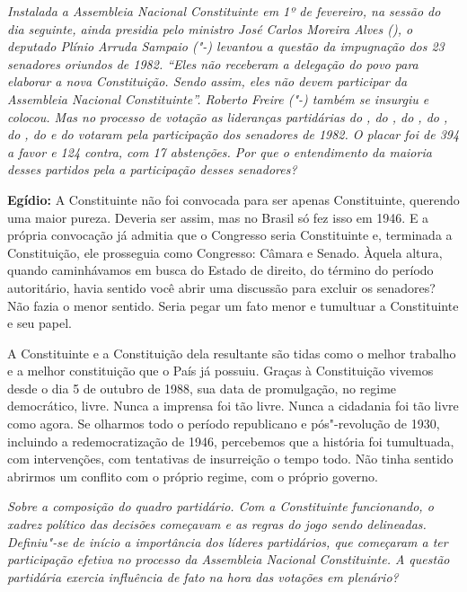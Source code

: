 \emph{Instalada a Assembleia Nacional Constituinte em 1º de fevereiro,
na sessão do dia seguinte, ainda presidia pelo ministro José Carlos
Moreira Alves (), o deputado Plínio Arruda Sampaio ("-) levantou a
questão da impugnação dos 23 senadores oriundos de 1982. ``Eles não
receberam a delegação do povo para elaborar a nova Constituição. Sendo
assim, eles não devem participar da Assembleia Nacional Constituinte''.
Roberto Freire ("-) também se insurgiu e colocou. Mas no processo de
votação as lideranças partidárias do , do , do , do , do
, do  e do  votaram pela participação dos senadores de 1982. O
placar foi de 394 a favor e 124 contra, com 17 abstenções. Por que o
entendimento da maioria desses partidos pela a participação desses
senadores?}

\textbf{Egídio:} A Constituinte não foi convocada para ser apenas
Constituinte, querendo uma maior pureza. Deveria ser assim, mas no
Brasil só fez isso em 1946. E a própria convocação já admitia que o
Congresso seria Constituinte e, terminada a Constituição, ele prosseguia
como Congresso: Câmara e Senado. Àquela altura, quando caminhávamos em
busca do Estado de direito, do término do período autoritário, havia
sentido você abrir uma discussão para excluir os senadores? Não fazia o
menor sentido. Seria pegar um fato menor e tumultuar a Constituinte e
seu papel.

A Constituinte e a Constituição dela resultante são tidas como o melhor
trabalho e a melhor constituição que o País já possuiu. Graças à
Constituição vivemos desde o dia 5 de outubro de 1988, sua data de
promulgação, no regime democrático, livre. Nunca a imprensa foi tão
livre. Nunca a cidadania foi tão livre como agora. Se olharmos todo o
período republicano e pós"-revolução de 1930, incluindo a
redemocratização de 1946, percebemos que a história foi tumultuada, com
intervenções, com tentativas de insurreição o tempo todo. Não tinha
sentido abrirmos um conflito com o próprio regime, com o próprio
governo.

\emph{Sobre a composição do quadro partidário. Com a Constituinte
funcionando, o xadrez político das decisões começavam e as regras do
jogo sendo delineadas. Definiu"-se de início a importância dos líderes
partidários, que começaram a ter participação efetiva no processo da
Assembleia Nacional Constituinte. A questão partidária exercia
influência de fato na hora das votações em plenário?}

